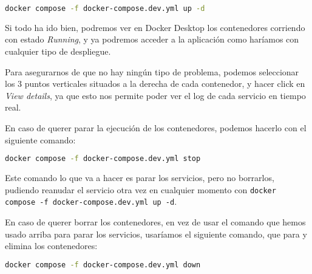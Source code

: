\begin{lstlisting}[language=Bash]
docker compose -f docker-compose.dev.yml up -d
\end{lstlisting}


Si todo ha ido bien, podremos ver en Docker Desktop los contenedores corriendo con estado \textit{Running}, y ya podremos acceder a la aplicación como haríamos con cualquier tipo de despliegue. 


Para asegurarnos de que no hay ningún tipo de problema, podemos seleccionar los 3 puntos verticales situados a la derecha de cada contenedor, y hacer click en \textit{View details}, ya que esto nos permite poder ver el log de cada servicio en tiempo real. 


En caso de querer parar la ejecución de los contenedores, podemos hacerlo con el siguiente comando:

\begin{lstlisting}[language=Bash]
  docker compose -f docker-compose.dev.yml stop
\end{lstlisting}


Este comando lo que va a hacer es parar los servicios, pero no borrarlos, pudiendo reanudar el servicio otra vez en cualquier momento con \verb,docker compose -f docker-compose.dev.yml up -d,.


En caso de querer borrar los contenedores, en vez de usar el comando que hemos usado arriba para parar los servicios, usaríamos el siguiente comando, que para y elimina los contenedores:

\begin{lstlisting}[language=Bash]
  docker compose -f docker-compose.dev.yml down
\end{lstlisting}



